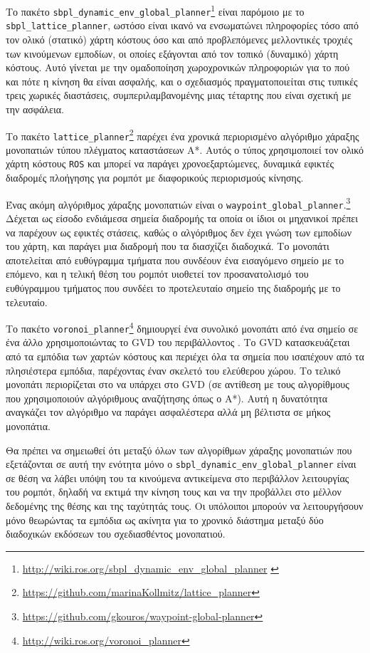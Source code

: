 Το πακέτο
\texttt{sbpl\_dynamic\_env\_global\_planner}\footnote{\url{http://wiki.ros.org/sbpl\_dynamic\_env\_global\_planner} \cite{Phillips2011}}
είναι παρόμοιο με το \texttt{sbpl\_lattice\_planner}, ωστόσο είναι ικανό να
ενσωματώνει πληροφορίες τόσο από τον ολικό (στατικό) χάρτη κόστους όσο και από
προβλεπόμενες μελλοντικές τροχιές των κινούμενων εμποδίων, οι οποίες εξάγονται
από τον τοπικό (δυναμικό) χάρτη κόστους. Αυτό γίνεται με την ομαδοποίηση
χωροχρονικών πληροφοριών για το πού και πότε η κίνηση θα είναι ασφαλής, και ο
σχεδιασμός πραγματοποιείται στις τυπικές τρεις χωρικές διαστάσεις,
συμπεριλαμβανομένης μιας τέταρτης που είναι σχετική με την ασφάλεια.

Το πακέτο
\texttt{lattice\_planner}\footnote{\url{https://github.com/marinaKollmitz/lattice\_planner}}
παρέχει ένα χρονικά περιορισμένο αλγόριθμο χάραξης μονοπατιών τύπου
πλέγματος καταστάσεων A*. Αυτός ο τύπος χρησιμοποιεί τον ολικό χάρτη κόστους
\texttt{ROS} και μπορεί να παράγει χρονοεξαρτώμενες, δυναμικά εφικτές διαδρομές
πλοήγησης για ρομπότ με διαφορικούς περιορισμούς κίνησης.

Ένας ακόμη αλγόριθμος χάραξης μονοπατιών είναι ο
\texttt{waypoint\_global\_planner}.\footnote{\url{https://github.com/gkouros/waypoint-global-planner}}
Δέχεται ως είσοδο ενδιάμεσα σημεία διαδρομής τα οποία οι ίδιοι οι μηχανικοί
πρέπει να παρέχουν ως εφικτές στάσεις, καθώς ο αλγόριθμος δεν έχει γνώση των
εμποδίων του χάρτη, και παράγει μια διαδρομή που τα διασχίζει διαδοχικά. Το
μονοπάτι αποτελείται από ευθύγραμμα τμήματα που συνδέουν ένα εισαγόμενο σημείο
με το επόμενο, και η τελική θέση του ρομπότ υιοθετεί τον προσανατολισμό του
ευθύγραμμου τμήματος που συνδέει το προτελευταίο σημείο της
διαδρομής με το τελευταίο.


Το πακέτο
\texttt{voronoi\_planner}\footnote{\url{http://wiki.ros.org/voronoi\_planner}}
δημιουργεί ένα συνολικό μονοπάτι από ένα σημείο σε ένα άλλο χρησιμοποιώντας το
GVD του περιβάλλοντος \cite{Bhattacharya2007}. Το GVD κατασκευάζεται από τα
εμπόδια των χαρτών κόστους και περιέχει όλα τα σημεία που ισαπέχουν από τα
πλησιέστερα εμπόδια, παρέχοντας έναν σκελετό του ελεύθερου χώρου. Το τελικό
μονοπάτι περιορίζεται στο να υπάρχει στο GVD (σε αντίθεση με τους αλγορίθμους
που χρησιμοποιούν αλγόριθμους αναζήτησης όπως ο A*). Αυτή η δυνατότητα
αναγκάζει τον αλγόριθμο να παράγει ασφαλέστερα αλλά μη βέλτιστα σε μήκος
μονοπάτια.

Θα πρέπει να σημειωθεί ότι μεταξύ όλων των αλγορίθμων χάραξης μονοπατιών που
εξετάζονται σε αυτή την ενότητα μόνο ο
\texttt{sbpl\_dynamic\_env\_global\_planner} είναι σε θέση να λάβει υπόψη του
τα κινούμενα αντικείμενα στο περιβάλλον λειτουργίας του ρομπότ, δηλαδή να
εκτιμά την κίνηση τους και να την προβάλλει στο μέλλον δεδομένης της θέσης και
της ταχύτητάς τους. Οι υπόλοιποι μπορούν να λειτουργήσουν μόνο θεωρώντας τα
εμπόδια ως ακίνητα για το χρονικό διάστημα μεταξύ δύο διαδοχικών εκδόσεων του
σχεδιασθέντος μονοπατιού.

